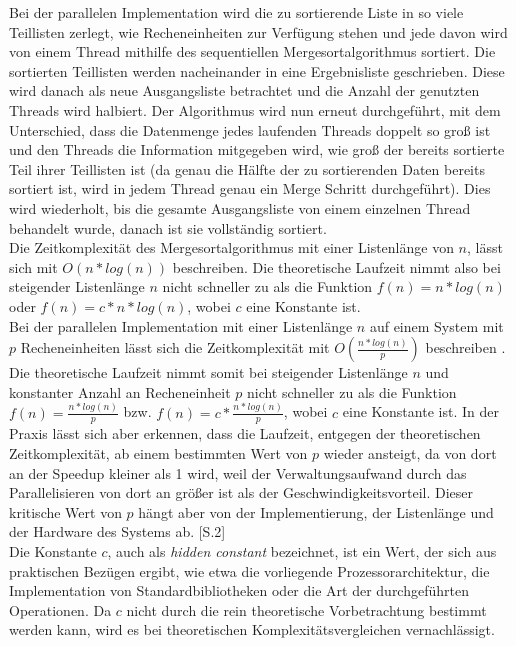Bei der parallelen Implementation wird die zu sortierende Liste in so viele Teillisten zerlegt, wie Recheneinheiten zur Verfügung stehen und jede davon wird von einem Thread mithilfe des sequentiellen Mergesortalgorithmus sortiert. Die sortierten Teillisten werden nacheinander in eine Ergebnisliste geschrieben. Diese wird danach als neue Ausgangsliste betrachtet und die Anzahl der genutzten Threads wird halbiert. Der Algorithmus wird nun erneut durchgeführt, mit dem Unterschied, dass die Datenmenge jedes laufenden Threads doppelt so groß ist und den Threads die Information mitgegeben wird, wie groß der bereits sortierte Teil ihrer Teillisten ist (da genau die Hälfte der zu sortierenden Daten bereits sortiert ist, wird in jedem Thread genau ein Merge Schritt durchgeführt). Dies wird wiederholt, bis die gesamte Ausgangsliste von einem einzelnen Thread behandelt wurde, danach ist sie vollständig sortiert.\\
Die Zeitkomplexität des Mergesortalgorithmus mit einer Listenlänge von $n$, lässt sich mit \mbox{$O(n*log(n))$} beschreiben. Die theoretische Laufzeit nimmt also bei steigender Listenlänge $n$ nicht schneller zu als die Funktion \mbox{$f(n)=n*log(n)$} oder \mbox{$f(n)=c*n*log(n)$}, wobei $c$ eine Konstante ist.\\
Bei der parallelen Implementation mit einer Listenlänge $n$ auf einem System mit $p$ Recheneinheiten lässt sich die Zeitkomplexität mit \mbox{$O(\frac{n*log(n)}{p})$} beschreiben . Die theoretische Laufzeit nimmt somit bei steigender Listenlänge $n$ und konstanter Anzahl an Recheneinheit $p$ nicht schneller zu als die Funktion \mbox{$f(n)=\frac{n*log(n)}{p}$} bzw. \mbox{$f(n)=c*\frac{n*log(n)}{p}$}, wobei $c$ eine Konstante ist. In der Praxis lässt sich aber erkennen, dass die Laufzeit, entgegen der theoretischen Zeitkomplexität, ab einem bestimmten Wert von $p$ wieder ansteigt, da von dort an der Speedup kleiner als 1 wird, weil der Verwaltungsaufwand durch das Parallelisieren von dort an größer ist als der Geschwindigkeitsvorteil. Dieser kritische Wert von $p$ hängt aber von der Implementierung, der Listenlänge und der Hardware des Systems ab. \cite{Qureshi_Performance_Comparison}[S.2]\\
Die Konstante $c$, auch als \textit{\glqq hidden constant\grqq} bezeichnet, ist ein Wert, der sich aus praktischen Bezügen ergibt, wie etwa die vorliegende Prozessorarchitektur, die Implementation von Standardbibliotheken oder die Art der durchgeführten Operationen. Da $c$ nicht durch die rein theoretische Vorbetrachtung bestimmt werden kann, wird es bei theoretischen Komplexitätsvergleichen vernachlässigt. \cite{Voroshilin_Hidden_Constants}

